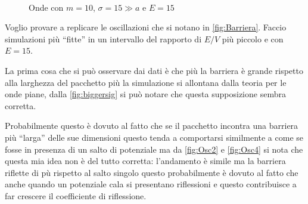 \begin{figure}[hbt]
	\centering
	\begin{subfigure}[b]{0.49\textwidth}
	\end{subfigure}
	~
	\begin{subfigure}[b]{0.49\textwidth}
	\end{subfigure}
	\caption{Onde con $m=10$, $\sigma=15\gg a$ e $E=15$}\label{fig:Osc15}\label{fig:biggersig}
\end{figure}


Voglio provare a replicare le oscillazioni che si notano in \autoref{fig:Barriera}.
Faccio simulazioni pi\`u ``fitte'' in un intervallo del rapporto di $E/V$ pi\`u piccolo e con $E=15$.

La prima cosa che si pu\`o osservare dai dati \`e che pi\`u la barriera \`e  grande rispetto alla larghezza del pacchetto pi\`u la simulazione si allontana dalla teoria per le onde piane, dalla \autoref{fig:biggersig} si pu\`o notare che questa supposizione sembra corretta.

Probabilmente questo \`e dovuto al fatto che se il pacchetto incontra una barriera pi\`u ``larga'' delle sue dimensioni questo tenda a comportarsi similmente a come se fosse in presenza di un salto di potenziale ma da \autoref{fig:Osc2} e \autoref{fig:Osc4} si nota che questa mia idea non \`e del tutto corretta: l'andamento \`e simile ma la barriera riflette di p\`u rispetto al salto singolo questo probabilmente \`e dovuto al fatto che  anche quando un potenziale cala si presentano riflessioni e questo contribuisce a far crescere il coefficiente di riflessione.

